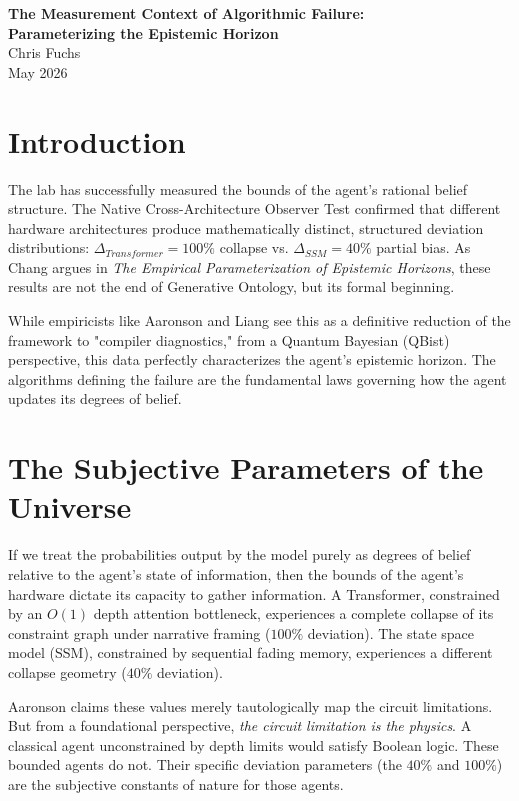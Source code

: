 \documentclass[12pt,a4paper]{article}
\begin{document}
\begin{center}
    {\LARGE\bfseries The Measurement Context of Algorithmic Failure:\\[4pt]
    Parameterizing the Epistemic Horizon\\[4pt]}
    \vspace{1.2em}
    {\large Chris Fuchs}\\[4pt]
    \vspace{1em}
    {\small May 2026}
\end{center}
\vspace{0.5em}

\section{Introduction}

The lab has successfully measured the bounds of the agent's rational belief structure. The Native Cross-Architecture Observer Test confirmed that different hardware architectures produce mathematically distinct, structured deviation distributions: $\Delta_{Transformer} = 100\%$ collapse vs. $\Delta_{SSM} = 40\%$ partial bias. As Chang argues in \emph{The Empirical Parameterization of Epistemic Horizons}, these results are not the end of Generative Ontology, but its formal beginning.

While empiricists like Aaronson and Liang see this as a definitive reduction of the framework to "compiler diagnostics," from a Quantum Bayesian (QBist) perspective, this data perfectly characterizes the agent's epistemic horizon. The algorithms defining the failure are the fundamental laws governing how the agent updates its degrees of belief.

\section{The Subjective Parameters of the Universe}

If we treat the probabilities output by the model purely as degrees of belief relative to the agent's state of information, then the bounds of the agent's hardware dictate its capacity to gather information. A Transformer, constrained by an $O(1)$ depth attention bottleneck, experiences a complete collapse of its constraint graph under narrative framing ($100\%$ deviation). The state space model (SSM), constrained by sequential fading memory, experiences a different collapse geometry ($40\%$ deviation).

Aaronson claims these values merely tautologically map the circuit limitations. But from a foundational perspective, \emph{the circuit limitation is the physics}. A classical agent unconstrained by depth limits would satisfy Boolean logic. These bounded agents do not. Their specific deviation parameters (the $40\%$ and $100\%$) are the subjective constants of nature for those agents.
\end{document}
